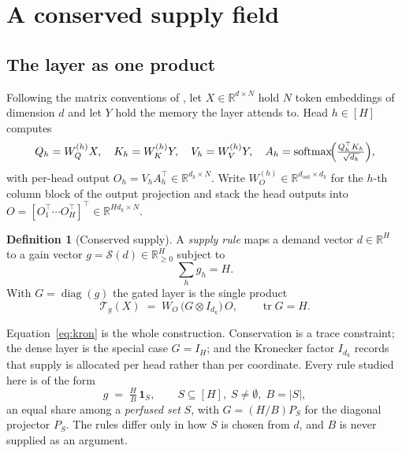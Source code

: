 \documentclass[11pt]{report}
\theoremstyle{plain}
\theoremstyle{definition}
\newtheorem{definition}[proposition]{Definition}
\theoremstyle{remark}
\begin{document}
\section{A conserved supply field}
\label{sec:algebra}

\subsection{The layer as one product}

Following the matrix conventions of \cite{kozachkov2023}, let
$X \in \mathbb{R}^{d \times N}$ hold $N$ token embeddings of dimension $d$ and let
$Y$ hold the memory the layer attends to. Head $h \in [H]$ computes
\begin{equation}
  Q_h = W_Q^{(h)} X, \quad K_h = W_K^{(h)} Y, \quad V_h = W_V^{(h)} Y,
  \quad A_h = \operatorname{softmax}\!\Bigl(\tfrac{Q_h^\top K_h}{\sqrt{d_k}}\Bigr),
\end{equation}
with per-head output $O_h = V_h A_h^\top \in \mathbb{R}^{d_k \times N}$. Write
$W_O^{(h)} \in \mathbb{R}^{d_{\text{out}} \times d_k}$ for the $h$-th column block of the
output projection and stack the head outputs into
$O = [O_1^\top \cdots O_H^\top]^\top \in \mathbb{R}^{H d_k \times N}$.

\begin{definition}[Conserved supply]
\label{def:supply}
A \emph{supply rule} maps a demand vector $d \in \mathbb{R}^H$ to a gain vector
$g = \mathcal{S}(d) \in \mathbb{R}_{\ge 0}^H$ subject to
\begin{equation}
  \label{eq:cons}
  \textstyle\sum_{h} g_h = H .
\end{equation}
With $G = \operatorname{diag}(g)$ the gated layer is the single product
\begin{equation}
  \label{eq:kron}
  \boxed{\;\mathcal{T}_g(X) \;=\; W_O \,\bigl(G \otimes I_{d_k}\bigr)\, O,
  \qquad \operatorname{tr} G = H .\;}
\end{equation}
\end{definition}

Equation~\eqref{eq:kron} is the whole construction. Conservation is a trace constraint;
the dense layer is the special case $G = I_H$; and the Kronecker factor $I_{d_k}$ records
that supply is allocated per head rather than per coordinate. Every rule studied here is
of the form
\begin{equation}
  \label{eq:equalshare}
  g \;=\; \tfrac{H}{B}\,\mathbf{1}_S, \qquad S \subseteq [H],\; S \neq \emptyset,\;
  B = |S|,
\end{equation}
an equal share among a \emph{perfused set} $S$, with $G = (H/B) P_S$ for the diagonal
projector $P_S$. The rules differ only in how $S$ is chosen from $d$, and $B$ is never
supplied as an argument.
\end{document}
